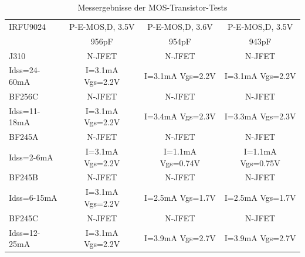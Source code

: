 \begin{table}[H]
\begin{center}
\begin{tabular}{| l | c | c | c |}
    \hline
IRFU9024     & P-E-MOS,D, 3.5V  & P-E-MOS,D, 3.6V  & P-E-MOS,D, 3.5V \\
             & 956pF            & 954pF            & 943pF \\
    \hline
J310         & N-JFET           & N-JFET           & N-JFET\\
Idss=24-60mA & I=3.1mA Vgs=2.2V & I=3.1mA Vgs=2.2V & I=3.1mA Vgs=2.2V \\
    \hline
BF256C       & N-JFET           & N-JFET           & N-JFET\\
Idss=11-18mA & I=3.1mA Vgs=2.2V & I=3.4mA Vgs=2.3V & I=3.3mA Vgs=2.3V \\
    \hline
BF245A       & N-JFET           & N-JFET           & N-JFET\\
Idss=2-6mA   & I=3.1mA Vgs=2.2V & I=1.1mA Vgs=0.74V & I=1.1mA Vgs=0.75V \\
    \hline
BF245B       & N-JFET           & N-JFET           & N-JFET\\
Idss=6-15mA  & I=3.1mA Vgs=2.2V & I=2.5mA Vgs=1.7V & I=2.5mA Vgs=1.7V \\
    \hline
BF245C       & N-JFET           & N-JFET           & N-JFET\\
Idss=12-25mA & I=3.1mA Vgs=2.2V & I=3.9mA Vgs=2.7V & I=3.9mA Vgs=2.7V \\
    \hline
    \end{tabular}
  \end{center}
  \caption{Messergebnisse der MOS-Transistor-Tests}
  \label{tab:mos} 
\end{table}
